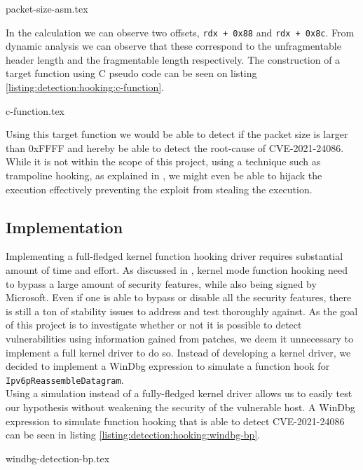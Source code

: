 \documentclass{report}
\begin{document}
{packet-size-asm.tex}

In the calculation we can observe two offsets, \texttt{rdx + 0x88} and \texttt{rdx + 0x8c}. From dynamic analysis we can observe that these correspond to the unfragmentable header length and the fragmentable length respectively. The construction of a target function using C pseudo code can be seen on listing \ref{listing:detection:hooking:c-function}.

{c-function.tex}

Using this target function we would be able to detect if the packet size is larger than 0xFFFF and hereby be able to detect the root-cause of CVE-2021-24086. While it is not within the scope of this project, using a technique such as trampoline hooking, as explained in , we might even be able to hijack the execution effectively preventing the exploit from stealing the execution.

\subsection{Implementation}
Implementing a full-fledged kernel function hooking driver requires substantial amount of time and effort. As discussed in , kernel mode function hooking need to bypass a large amount of security features, while also being signed by Microsoft. Even if one is able to bypass or disable all the security features, there is still a ton of stability issues to address and test thoroughly against. As the goal of this project is to investigate whether or not it is possible to detect vulnerabilities using information gained from patches, we deem it unnecessary to implement a full kernel driver to do so. Instead of developing a kernel driver, we decided to implement a WinDbg expression\cite{url:windbg:expression} to simulate a function hook for \texttt{Ipv6pReassembleDatagram}.
\\
Using a simulation instead of a fully-fledged kernel driver allows us to easily test our hypothesis without weakening the security of the vulnerable host. A WinDbg expression to simulate function hooking that is able to detect CVE-2021-24086 can be seen in listing \ref{listing:detection:hooking:windbg-bp}.

{windbg-detection-bp.tex}
\end{document}
